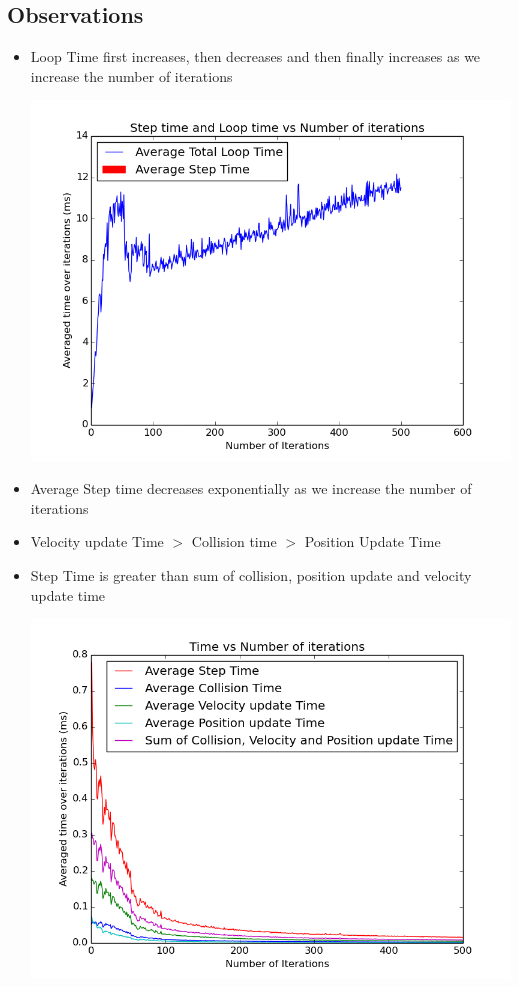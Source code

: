 \documentclass[11pt]{article}
\begin{document}
\subsection{Observations}
\begin{itemize}
\item Loop Time first increases, then decreases and then finally increases as we increase the number of iterations
\begin{center}
\includegraphics[scale=0.45]{images/g13_plot01}
\end{center}
\item Average Step time decreases exponentially as we increase the number of iterations 
\item Velocity update Time $>$ Collision time $>$ Position Update Time
\item Step Time is greater than sum of collision, position update and velocity update time
\begin{center}
\includegraphics[scale=0.45]{images/g13_plot02}

\end{center}
\end{itemize}
\end{document}
